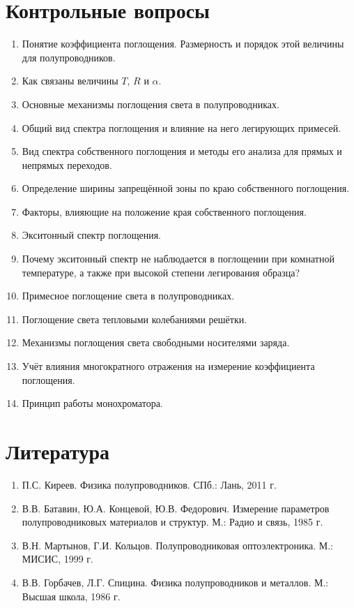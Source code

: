 \section{Контрольные вопросы}
\begin{enumerate}
\item Понятие коэффициента поглощения. Размерность и порядок этой величины для полупроводников.
\item Как связаны величины $T$, $R$ и $\alpha$.
\item Основные механизмы поглощения света в полупроводниках.
\item Общий вид спектра поглощения и влияние на него легирующих примесей.
\item Вид спектра собственного поглощения и методы его анализа для прямых и непрямых переходов.
\item Определение ширины запрещённой зоны по краю собственного поглощения.
\item Факторы, влияющие на положение края собственного поглощения.
\item Экситонный спектр поглощения.
\item Почему экситонный спектр не наблюдается в поглощении при комнатной температуре, а также при высокой степени легирования образца?
\item Примесное поглощение света в полупроводниках.
\item Поглощение света тепловыми колебаниями решётки.
\item Механизмы поглощения света свободными носителями заряда.
\item Учёт влияния многократного отражения на измерение коэффициента поглощения.
\item Принцип работы монохроматора.
\end{enumerate}

\section{Литература}
\begin{enumerate}
\item П.С. Киреев. Физика полупроводников. СПб.: Лань, 2011 г.
\item В.В. Батавин, Ю.А. Концевой, Ю.В. Федорович. Измерение параметров полупроводниковых материалов и структур. М.: Радио и связь, 1985 г.
\item В.Н. Мартынов, Г.И. Кольцов. Полупроводниковая оптоэлектроника. М.: МИСИС, 1999 г.
\item В.В. Горбачев, Л.Г. Спицина. Физика полупроводников и металлов. М.: Высшая школа, 1986 г.
\end{enumerate}